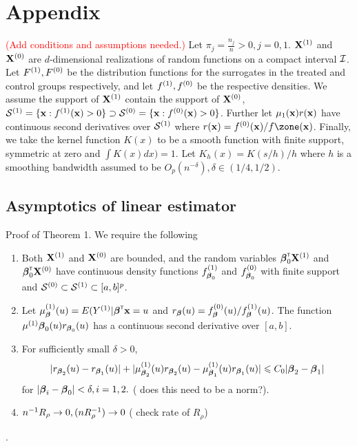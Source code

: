 \documentclass[useAMS,usenatbib,referee]{biom}
\def\Isc{{\cal I}}
\begin{document}
\section{Appendix}
\textcolor{red}{(Add conditions and assumptions needed.)}
Let $\pi_j = \frac{n_j}{n} > 0, j = 0,1$. ${\bf X}^{(1)}$ and ${\bf X}^{(0)}$ are $d$-dimensional realizations of random functions on a compact interval $\Isc$. Let $F^{(1)}, F^{(0)}$ be the distribution functions for the surrogates in the treated and control groups respectively, and let $f^{(1)}, f^{(0)}$ be the respective densities. We assume the support of ${\bf X}^{(1)}$ contain the support of ${\bf X}^{(0)}$, $\Ssc\sone = \{\bx : f\sone(\bx) > 0\} \supset \Ssc\szero = \{\bx : f\szero(\bx) > 0\}$. Further {\color{red} let $\mu_1({\bf x})r({\bf x})$ have continuous second derivatives over $\Ssc\sone$} where $r(\bx) = f\szero(\bx)/f\zone(\bx)$. Finally, we take the kernel function $K(x)$ to be a smooth function with finite support, symmetric at zero and $\int K(x)dx) = 1$. Let $K_h(x) = K(s/h)/h$ where $h$ is a smoothing bandwidth assumed to be $O_p(n^{-\delta}), \delta \in (1/4, 1/2)$. 

\subsection{Asymptotics of linear estimator}
Proof of Theorem 1. We require the following
\begin{enumerate}
    \item Both ${\bf X}^{(1)}$ and ${\bf X}^{(0)}$ are bounded, and the random variables $\boldsymbol{\beta}_0^{{\sf \scriptscriptstyle{T}}}{\bf X}^{(1)}$ and $\boldsymbol{\beta}_0^{{\sf \scriptscriptstyle{T}}}{\bf X}^{(0)}$ have continuous density functions $f^{(1)}_{\boldsymbol{\beta}_0}$ and $f^{(0)}_{\boldsymbol{\beta}_0}$ with finite support and $\Ssc\szero \subset \Ssc\sone \subset [a,b]^p$. 
    \item Let $\mu^{(1)}_{\boldsymbol{\beta}}(u) = E(Y^{(1)} | \boldsymbol{\beta}^{{\sf \scriptscriptstyle{T}}}{\bf x} = u$ and $r_{\boldsymbol{\beta}}(u) = f^{(0)}_{\boldsymbol{\beta}}(u) / f^{(1)}_{\boldsymbol{\beta}}(u)$. The function $\mu^{(1)}{\boldsymbol{\beta}_0}(u)r_{\boldsymbol{\beta}_0}(u)$ has a continuous second derivative over $[a,b]$.
    \item For sufficiently small $\delta > 0$,
    \begin{align*}
        |r_{\boldsymbol{\beta}_2}(u) - r_{\boldsymbol{\beta}_1}(u)| + |\mu_{\boldsymbol{\beta}_2}^{(1)}(u)r_{\boldsymbol{\beta}_2}(u) - \mu_{\boldsymbol{\beta}_1}^{(1)}(u)r_{\boldsymbol{\beta}_1}(u)| \leqslant C_0|\boldsymbol{\beta}_2 - \boldsymbol{\beta}_1|
    \end{align*}
    for $|\boldsymbol{\beta}_i - \boldsymbol{\beta}_0| < \delta, i = 1,2.$ ({\color{red} does this need to be a norm?}).
    \item $n^{-1} R_\rho \rightarrow 0, (nR_\rho^{-1}) \rightarrow 0$ ({\color{red} check rate of $R_\rho$})
\end{enumerate}.
\end{document}
